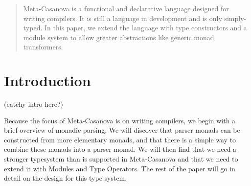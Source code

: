 \begin{abstract}
Meta-Casanova is a functional and declarative language designed for writing compilers. 
It is still a language in development and is only simply-typed.
In this paper, we extend the language with type constructors and a module system to allow greater abstractions like generic monad transformers.
\end{abstract}

\tableofcontents
\pagebreak 

\section{Introduction}
(catchy intro here?)

Because the focus of Meta-Casanova is on writing compilers,
we begin with a brief overview of monadic parsing.
We will discover that parser monads can be constructed from more elementary monads,
and that there is a simple way to combine these monads into a parser monad.
We will then find that we need a stronger typesystem than is supported in Meta-Casanova
and that we need to extend it with Modules and Type Operators.
The rest of the paper will go in detail on the design for this type system.

